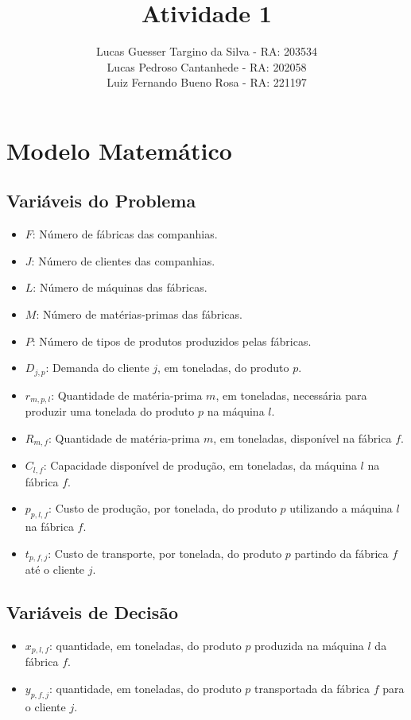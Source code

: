 \documentclass{article}
\title{Atividade 1}
\author{Lucas Guesser Targino da Silva - RA: 203534\\
Lucas Pedroso Cantanhede - RA: 202058\\
Luiz Fernando Bueno Rosa - RA: 221197}
\begin{document}
\maketitle

\section{Modelo Matemático}

\subsection{Variáveis do Problema}
\label{constraint:exercise-variables}

\begin{itemize}
	\item $F$: Número de fábricas das companhias.
	\item $J$: Número de clientes das companhias.
	\item $L$: Número de máquinas das fábricas.
	\item $M$: Número de matérias-primas das fábricas.
	\item $P$: Número de tipos de produtos produzidos pelas fábricas.
	\item $D_{j,p}$: Demanda do cliente $j$, em toneladas, do produto $p$.
	\item $r_{m,p,l}$: Quantidade de matéria-prima $m$, em toneladas, necessária para produzir uma tonelada do produto $p$ na máquina $l$.
	\item $R_{m, f}$: Quantidade de matéria-prima $m$, em toneladas, disponível na fábrica $f$.
	\item $C_{l,f}$: Capacidade disponível de produção, em toneladas, da máquina $l$ na fábrica $f$.
	\item $p_{p,l,f}$: Custo de produção, por tonelada, do produto $p$ utilizando a máquina $l$ na fábrica $f$.
	\item $t_{p,f,j}$: Custo de transporte, por tonelada, do produto $p$ partindo da fábrica $f$ até o cliente $j$.
\end{itemize}

\subsection{Variáveis de Decisão}

\begin{itemize}
	\item $x_{p,l,f}$: quantidade, em toneladas, do produto $p$ produzida na máquina $l$ da fábrica $f$.
	\item $y_{p,f,j}$: quantidade, em toneladas, do produto $p$ transportada da fábrica $f$ para o cliente $j$.
\end{itemize}
\end{document}
